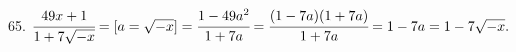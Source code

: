 65. $\cfrac{49x+1}{1+7\sqrt{-x}}=[a=\sqrt{-x}]=\cfrac{1-49a^2}{1+7a}=\cfrac{(1-7a)(1+7a)}{1+7a}=1-7a=1-7\sqrt{-x}.$\\
